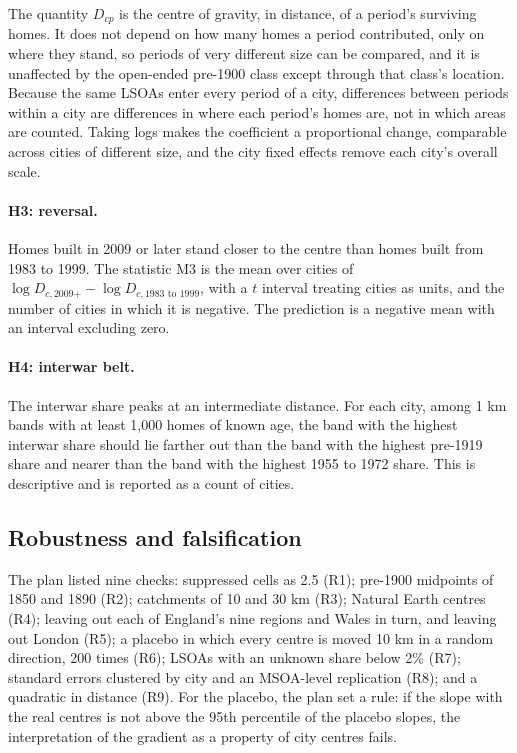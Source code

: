 \documentclass[11pt,a4paper]{article}
\begin{document}
The quantity $D_{cp}$ is the centre of gravity, in distance, of a period's surviving homes. It does not depend on how many homes a period contributed, only on where they stand, so periods of very different size can be compared, and it is unaffected by the open-ended pre-1900 class except through that class's location. Because the same LSOAs enter every period of a city, differences between periods within a city are differences in where each period's homes are, not in which areas are counted. Taking logs makes the coefficient a proportional change, comparable across cities of different size, and the city fixed effects remove each city's overall scale.

\paragraph{H3: reversal.} Homes built in 2009 or later stand closer to the centre than homes built from 1983 to 1999. The statistic M3 is the mean over cities of $\log D_{c,\text{2009+}}-\log D_{c,\text{1983 to 1999}}$, with a $t$ interval treating cities as units, and the number of cities in which it is negative. The prediction is a negative mean with an interval excluding zero.

\paragraph{H4: interwar belt.} The interwar share peaks at an intermediate distance. For each city, among 1 km bands with at least 1,000 homes of known age, the band with the highest interwar share should lie farther out than the band with the highest pre-1919 share and nearer than the band with the highest 1955 to 1972 share. This is descriptive and is reported as a count of cities.

\subsection{Robustness and falsification}
The plan listed nine checks: suppressed cells as 2.5 (R1); pre-1900 midpoints of 1850 and 1890 (R2); catchments of 10 and 30 km (R3); Natural Earth centres (R4); leaving out each of England's nine regions and Wales in turn, and leaving out London (R5); a placebo in which every centre is moved 10 km in a random direction, 200 times (R6); LSOAs with an unknown share below 2\% (R7); standard errors clustered by city and an MSOA-level replication (R8); and a quadratic in distance (R9). For the placebo, the plan set a rule: if the slope with the real centres is not above the 95th percentile of the placebo slopes, the interpretation of the gradient as a property of city centres fails.
\end{document}
